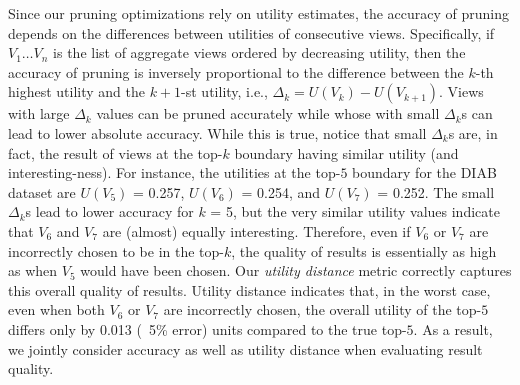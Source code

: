 Since our pruning optimizations rely on utility estimates, the accuracy of pruning
depends on the differences between utilities of consecutive views.
Specifically, if $V_1 \ldots V_n$ is the list of aggregate views ordered by decreasing 
utility, then the accuracy of pruning is inversely proportional to 
the difference between the $k$-th highest utility and the $k+1$-st utility, 
i.e., $\Delta_k = U(V_k) - U(V_{k+1})$.
Views with large $\Delta_k$ values can be pruned accurately while whose with
small $\Delta_k$s can lead to lower absolute accuracy.
While this is true, notice that small $\Delta_k$s are, in fact, the result of views at 
the top-$k$ boundary having similar utility (and interesting-ness).
For instance, the utilities at the top-$5$ boundary for the DIAB dataset are 
$U(V_5)$ = 0.257, $U(V_6)$ = 0.254, and $U(V_7)$ = 0.252.
The small $\Delta_k$s lead to lower accuracy for $k$ = 5, but the 
very similar utility values indicate that $V_6$ and $V_7$ are (almost) equally interesting.
Therefore, even if $V_6$ or $V_7$ are incorrectly chosen to be in the top-$k$, 
the quality of results is essentially as high as when $V_5$ would have been chosen.
Our {\em utility distance} metric correctly captures this overall quality of results.
Utility distance indicates that, in the worst case, even when both $V_6$ or $V_7$ are 
incorrectly chosen, the overall utility of the top-$5$ differs only by 0.013 (~5\% error) 
units compared to the true top-$5$.
As a result, we jointly consider accuracy as well as utility distance when evaluating 
result quality.



